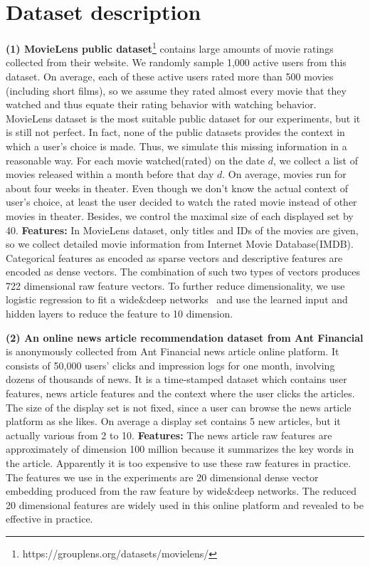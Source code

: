\documentclass{article} %
\begin{document}
\section{Dataset description}\label{app:dataset}
{\bf (1) MovieLens public dataset}\footnote{https://grouplens.org/datasets/movielens/} contains large amounts of movie ratings collected from their website. We randomly sample 1,000 active users from this dataset. On average, each of these active users rated more than 500 movies (including short films), so we assume they rated almost every movie that they watched and thus equate their rating behavior with watching behavior. MovieLens dataset is the most suitable public dataset for our experiments, but it is still not perfect. In fact, none of the public datasets provides the context in which a user's choice is made. Thus, we simulate this missing information in a reasonable way. For each movie watched(rated) on the date $d$, we collect a list of movies released within a month before that day $d$. On average, movies run for about four weeks in theater. Even though we don't know the actual context of user's choice, at least the user decided to watch the rated movie instead of other movies in theater. Besides, we control the maximal size of each displayed set by 40. {\bf Features:} In MovieLens dataset, only titles and IDs of the movies are given, so we collect detailed movie information from Internet Movie Database(IMDB). Categorical features as encoded as sparse vectors and descriptive features are encoded as dense vectors. The combination of such two types of vectors produces 722 dimensional raw feature vectors. To further reduce dimensionality, we use logistic regression to fit a wide\&deep networks~\citep{ChengKocHarmsen16} and use the learned input and hidden layers to reduce the feature to 10 dimension.

{\bf (2) An online news article recommendation dataset from Ant Financial} is anonymously collected from Ant Financial news article online platform. It consists of 50,000 users' clicks and impression logs for one month, involving dozens of thousands of news. It is a time-stamped dataset which contains user features, news article features and the context where the user clicks the articles. The size of the display set is not fixed, since a user can browse the news article platform as she likes. On average a display set contains 5 new articles, but it actually various from 2 to 10.  {\bf Features:} The news article raw features are approximately of dimension 100 million because it summarizes the key words in the article. Apparently it is too expensive to use these raw features in practice. The features we use in the experiments are 20 dimensional dense vector embedding produced from the raw feature by wide\&deep networks. 
The reduced 20 dimensional features are widely used in this online platform and revealed to be effective in practice.
\end{document}
